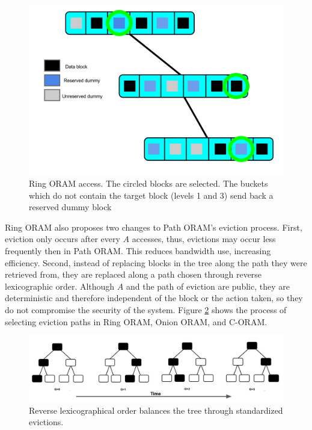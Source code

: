\documentclass[12pt, oneside]{article}   	%
\begin{document}
\begin{figure}[h!]
  \includegraphics[width=\linewidth]{ringaccess1.png}
  \caption{Ring ORAM access. The circled blocks are selected. The buckets which do not contain the target block (levels 1 and 3) send back a reserved dummy block}
  \label{fig:ringaccess}
\end{figure}


Ring ORAM also proposes two changes to Path ORAM's eviction process.  First, eviction only occurs after every $A$ accesses, thus, evictions may occur less frequently then in Path ORAM. This reduces bandwidth use, increasing efficiency. Second, instead of replacing blocks in the tree along the path they were retrieved from, they are replaced along a path chosen through reverse lexicographic order. Although $A$ and the path of eviction are public, they are deterministic and therefore independent of the block or the action taken, so they do not compromise the security of the system. Figure \ref{fig:rlo} shows the process of selecting eviction paths in Ring ORAM, Onion ORAM, and C-ORAM.


\begin{figure}[h!]
  \includegraphics[width=\linewidth]{rlo.png}
  \caption{Reverse lexicographical order balances the tree through standardized evictions.}
  \label{fig:rlo}
\end{figure}
\end{document}

